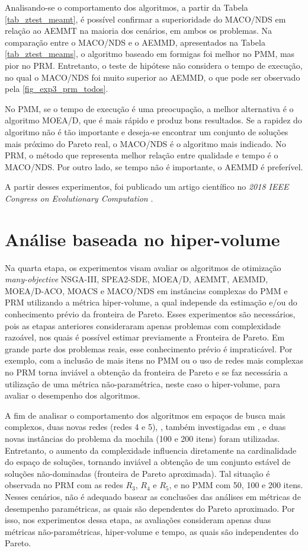 Analisando-se o comportamento dos algoritmos, a partir da Tabela \ref{tab_ztest_meamt}, é possível confirmar a superioridade do MACO/NDS em relação ao AEMMT na maioria dos cenários, em ambos os problemas. Na comparação entre o MACO/NDS e o AEMMD, apresentados na Tabela \ref{tab_ztest_meams}, o algoritmo baseado em formigas foi melhor no PMM, mas pior no PRM. Entretanto, o teste de hipótese não considera o tempo de execução, no qual o MACO/NDS foi muito superior ao AEMMD, o que pode ser observado pela \autoref{fig_exp3_prm_todos}.

No PMM, se o tempo de execução é uma preocupação, a melhor alternativa é o algoritmo MOEA/D, que é mais rápido e produz bons resultados. Se a rapidez do algoritmo não é tão importante e deseja-se encontrar um conjunto de soluções mais próximo do Pareto real, o MACO/NDS é o algoritmo mais indicado. No PRM, o método que representa melhor relação entre qualidade e tempo é o MACO/NDS. Por outro lado, se tempo não é importante, o AEMMD é preferível.

A partir desses experimentos, foi publicado um artigo científico no \textit{2018 IEEE Congress on Evolutionary Computation} \cite{Franca2018}.

\section{Análise baseada no hiper-volume}
\label{section_experimentos_etapa4}

Na quarta etapa, os experimentos visam avaliar os algoritmos de otimização \textit{many-objective} NSGA-III, SPEA2-SDE, MOEA/D, AEMMT, AEMMD, MOEA/D-ACO, MOACS e MACO/NDS em instâncias complexas do PMM e PRM utilizando a métrica hiper-volume, a qual independe da estimação e/ou do conhecimento prévio da fronteira de Pareto. Esses experimentos são necessários, pois as etapas anteriores consideraram apenas problemas com complexidade razoável, nos quais é possível estimar previamente a Fronteira de Pareto. Em grande parte dos problemas reais, esse conhecimento prévio é impraticável. Por exemplo, com a inclusão de mais itens no PMM ou o uso de redes mais complexas no PRM torna inviável a obtenção da fronteira de Pareto e se faz necessária a utilização de uma métrica não-paramétrica, neste caso o hiper-volume, para avaliar o desempenho dos algoritmos.

A fim de analisar o comportamento dos algoritmos em espaços de busca mais complexos, duas novas redes (redes 4 e 5), , também investigadas em \cite{LafetaThesis}, e duas novas instâncias do problema da mochila (100 e 200 itens) foram utilizadas. Entretanto, o aumento da complexidade influencia diretamente na cardinalidade do espaço de soluções, tornando inviável a obtenção de um conjunto estável de soluções não-dominadas (fronteira de Pareto aproximada). Tal situação é observada no PRM com as redes $R_3$, $R_4$ e $R_5$, e no PMM com 50, 100 e 200 itens. Nesses cenários, não é adequado basear as conclusões das análises em métricas de desempenho paramétricas, as quais são dependentes do Pareto aproximado. Por isso, nos experimentos dessa etapa, as avaliações consideram apenas duas métricas não-paramétricas, hiper-volume e tempo, as quais são independentes do Pareto.

